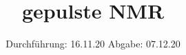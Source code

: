 

\subject{V 49}
\title{gepulste NMR}
\date{%
  Durchführung: 16.11.20
  \hspace{3em}
  Abgabe: 07.12.20
}



\maketitle
\thispagestyle{empty}
\tableofcontents
\newpage






\printbibliography{}


